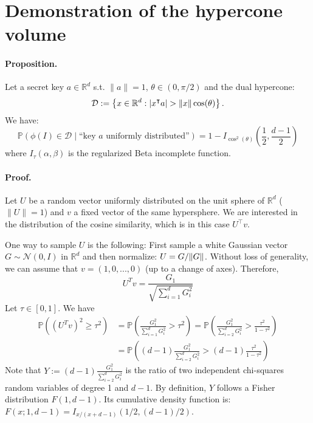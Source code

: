 

\section{Demonstration of the hypercone volume}
\label{app/ssl-watermarking}

\paragraph*{Proposition.}
Let a secret key $a\in \mathbb R ^d$ s.t. $\|a\|=1$, $\theta \in (0, \pi/2)$ and the dual hypercone:
\begin{equation*}
     \mathcal{D} := \left\{  x \in \mathbb{R}^d :  \lvert{ x^\intercal a}\rvert > \lVert{ x}\rVert \cos (\theta) \right\}.
\end{equation*}
We have:
\begin{equation*}
   \mathbb{P}\left(\phi(I)\in \mathcal D \mid \text{``key } a \text{ uniformly distributed''}\right)
    = 1-I_{\cos^2(\theta)} \left(\frac{1}{2}, \frac{d-1}{2} \right)
\end{equation*}
where $I_\tau (\alpha, \beta)$ is the regularized Beta incomplete function.

\paragraph*{Proof.}
Let $ U $ be a random vector uniformly distributed on the unit sphere of $ \mathbb{R}^d $ ($\|U\| = 1$) and $ v $ a fixed vector of the same hypersphere. 
We are interested in the distribution of the cosine similarity, which is in this case $U^\top v$.

One way to sample $U$ is the following: First sample a white Gaussian vector $G \sim \mathcal{N}(0,I)$ in $\mathbb R ^d$ and then normalize: $U=G/\lVert{G}\rVert$.
Without loss of generality, we can assume that $v = (1,0,...,0)$ (up to a change of axes). Therefore, $$U^T v = \frac{G_1}{\sqrt{\sum_{i=1}^d G_i^2}}$$
Let $\tau \in [0,1]$. We have 
\begin{align*}
    \mathbb{P}\left((U^T v)^{2} \geq \tau^{2}\right) &=\mathbb{P}\left(\frac{G_{1}^{2}}{\sum_{i=1}^{d} G_{i}^{2}} > \tau^{2}\right)
    =\mathbb{P}\left(\frac{G_{1}^{2}}{\sum_{i=2}^{d} G_{i}^{2}} > \frac{\tau^{2}}{1-\tau^{2}}\right)\\
    &=\mathbb{P}\left((d-1)\frac{G_{1}^{2}}{\sum_{i=2}^{d} G_{i}^{2}} > (d-1)\frac{\tau^{2}}{1-\tau^{2}}\right)
\end{align*}
Note that $Y := (d-1)\frac{G_{1}^{2}}{\sum_{i=2}^{d} G_{i}^{2}}$ is the ratio of two independent chi-squares random variables of degree 1 and $d-1$. By definition, $Y$ follows a Fisher distribution $F(1,d-1)$. Its cumulative density function is: $F(x; 1, d-1) = I_{x/(x+d-1)}(1/2, (d-1)/2)$. 

